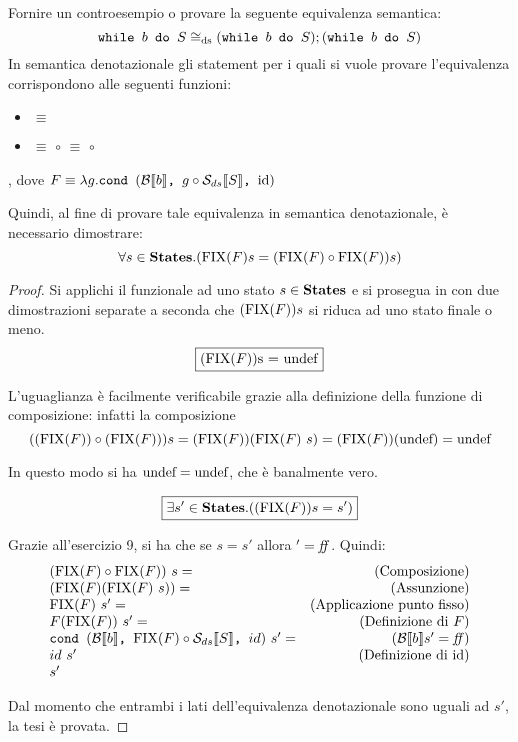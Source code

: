 {
  Fornire un controesempio o provare la seguente equivalenza semantica:
  $$
  \wbS{b}{S} \eqDS (\wbS{b}{S});(\wbS{b}{S})
  $$
}
{}
In semantica denotazionale gli statement per i quali si vuole provare
l'equivalenza corrispondono alle seguenti funzioni:
\begin{itemize}
  \item {}
        $\equiv$
  \item {}
        $\equiv$
         $\circ$ 
        $\equiv$
         $\circ$ 
\end{itemize}
, dove $F \equiv{} \lambda{g}.\cond{b}{g \circ \dsCtxt{S}}{\idDS}$

Quindi, al fine di provare tale equivalenza in semantica denotazionale, è
necessario dimostrare:
\begin{equation}
\forall s \in \states.(\fixp{F}s = (\fixp{F} \circ \fixp{F})s)
\label{hw10-thesis}
\end{equation}

\begin{proof}

Si applichi il funzionale  ad uno stato $s\in\states$ e si prosegua in
con due dimostrazioni separate a seconda che $(\fixp{F}) s$ si riduca ad uno
stato finale o meno.
$$
\boxed{(\fixp{F}) $s = \undefDS$}
$$

L'uguaglianza è facilmente verificabile grazie alla definizione della funzione
di composizione: infatti la composizione 
$$
((\fixp{F}) \circ (\fixp{F})) s = (\fixp{F})(\fixp{F}\text{ }s) = (\fixp{F})(\undefDS) = \undefDS
$$


In questo modo si ha $\undefDS = \undefDS$, che è banalmente vero.

$$
\boxed{\exists s' \in \states.((\fixp{F}) s = s')}
$$

Grazie all'esercizio 9, si ha che se  $s = s'$ allora
$' = \semfalse$. Quindi:
$$
\begin{array}{lr}
(\fixp{F} \circ \fixp{F})\ s = & \text{(Composizione)} \\
(\fixp{F} (\fixp{F}\ s)) = & \text{(Assunzione)} \\
\fixp{F}\  s' = & \text{(Applicazione punto fisso)}\\
F(\fixp{F})\ s' = & \text{(Definizione di $F$)} \\
\cond{b}{\fixp{F} \circ \dsCtxt{S}}{id}\ s' = & (\B{b}' = \semfalse) \\
id\ s' & \text{(Definizione di \idDS)} \\
s'
\end{array}
$$



Dal momento che entrambi i lati dell'equivalenza denotazionale sono uguali ad
$s'$, la tesi è provata.

\end{proof}
